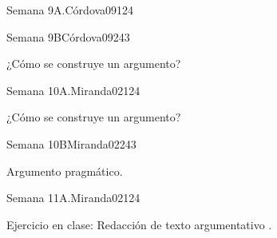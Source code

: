 \begin{syllabus}
\begin{unit}{Semana 9A.}{Córdova09}{12}{4}
\begin{topics}
   \end{topics}
   \begin{learningoutcomes}
      \item 
   \end{learningoutcomes}
\end{unit}

\begin{unit}{Semana 9B}{Córdova09}{24}{3}
   \begin{topics}
      \item ¿Cómo se construye un argumento?
   \end{topics}

   \begin{learningoutcomes}
      \item 
      \item
      \item 
      \end{learningoutcomes}
\end{unit}


\begin{unit}{Semana 10A.}{Miranda02}{12}{4}
   \begin{topics}
      \item ¿Cómo se construye un argumento?
   \end{topics}
   \begin{learningoutcomes}
      \item 
   \end{learningoutcomes}
\end{unit}

\begin{unit}{Semana 10B}{Miranda02}{24}{3}
   \begin{topics}
      \item Argumento pragmático.
   \end{topics}

   \begin{learningoutcomes}
      \item 
      \item
      \item 
      \end{learningoutcomes}
\end{unit}

\begin{unit}{Semana 11A.}{Miranda02}{12}{4}
   \begin{topics}
      \item  Ejercicio en clase: Redacción de texto argumentativo .
   \end{topics}
   \begin{learningoutcomes}
      \item 
   \end{learningoutcomes}
\end{unit}


\end{syllabus}
